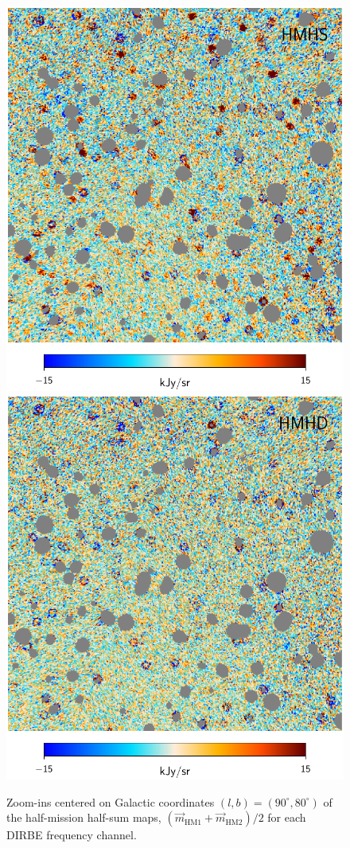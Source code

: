 \documentclass{aa}
\newcommand{\m}[0]{\vec{m}}
\begin{document}
\begin{figure}
  \centering
  \includegraphics[width=0.45\linewidth]{figs/dirbe_03_hmhs_v1_zoom.pdf}\hspace*{0mm}
  \includegraphics[width=0.45\linewidth]{figs/dirbe_03_hmhd_v1_zoom.pdf}
  \caption{Zoom-ins centered on Galactic coordinates $(l,b)=(90^{\circ},80^{\circ})$ of the half-mission half-sum maps, $(\m_{\mathrm{HM1}}+\m_{\mathrm{HM2}})/2$ for each DIRBE frequency channel. }
  \label{fig:hmhs_zoom}
\end{figure}
\end{document}
